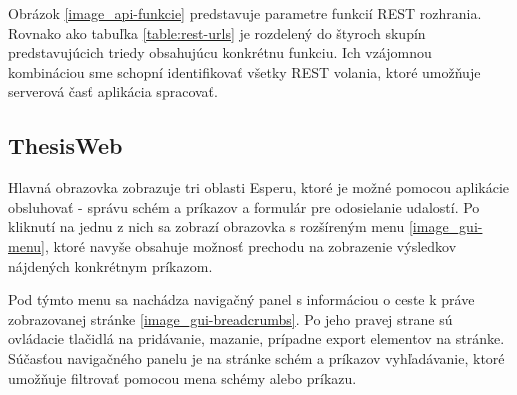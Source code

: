 	Obrázok \ref{image_api-funkcie} predstavuje parametre funkcií REST rozhrania. Rovnako ako tabuľka \ref{table:rest-urls} je rozdelený do štyroch skupín predstavujúcich triedy obsahujúcu konkrétnu funkciu. Ich vzájomnou kombináciou sme schopní identifikovať všetky REST volania, ktoré umožňuje serverová časť aplikácia spracovať.


	\subsection{ThesisWeb}
	Hlavná obrazovka zobrazuje tri oblasti Esperu, ktoré je možné pomocou aplikácie obsluhovať - správu schém a príkazov a formulár pre odosielanie udalostí. Po kliknutí na jednu z nich sa zobrazí obrazovka s rozšíreným menu \ref{image_gui-menu}, ktoré navyše obsahuje možnosť prechodu na zobrazenie výsledkov nájdených konkrétnym príkazom.
	
	Pod týmto menu sa nachádza navigačný panel s informáciou o ceste k práve zobrazovanej stránke \ref{image_gui-breadcrumbs}. Po jeho pravej strane sú ovládacie tlačidlá na pridávanie, mazanie, prípadne export elementov na stránke. Súčasťou navigačného panelu je na stránke schém a príkazov vyhľadávanie, ktoré umožňuje filtrovať pomocou mena schémy alebo príkazu.
	
